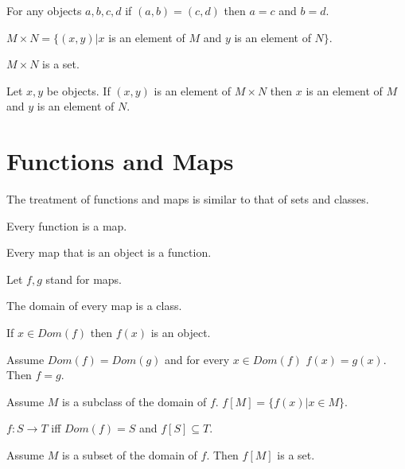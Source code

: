 \documentclass[11pt]{article}
\begin{document}
\begin{forthel}
\begin{axiom}
For any objects $a,b,c,d$ if $(a,b) = (c,d)$ then $a = c$
and $b = d$.
\end{axiom}

\begin{definition}
$M \times N = \{(x,y) | x$ is an element of $M$ and $y$
is an element of $N\}$.
\end{definition}

\begin{axiom}
$M \times N$ is a set.
\end{axiom}

\begin{lemma}
Let $x,y$ be objects.
If $(x,y)$ is an element of $M \times N$ then $x$ is an
element of $M$ and $y$ is an element of $N$.
\end{lemma}

\end{forthel}
\section{Functions and Maps}
The treatment of functions and maps is similar to that
of sets and classes.
\begin{forthel}

\begin{lemma} Every function is a map.
\end{lemma}

\begin{lemma} Every map that is an object is a function.
\end{lemma}

Let $f,g$ stand for maps.

\begin{lemma} The domain of every map is a class.
\end{lemma}

\begin{lemma} If $x \in Dom(f)$ then $f(x)$ is an object.
\end{lemma}

\begin{lemma}  Assume $Dom(f)=Dom(g)$ and for every $x \in Dom(f)$
$f(x)=g(x)$. Then $f=g$.
\end{lemma}

\begin{definition}
Assume $M$ is a subclass of the domain of $f$.
$f[M] = \{ f(x) | x \in M \}$.
\end{definition}

\begin{definition}
$f : S \rightarrow T$ iff $Dom (f) = S$ and $f[S] \subseteq T$.
\end{definition}

\begin{axiom} 
Assume $M$ is a subset of the domain of $f$.
Then $f[M]$ is a set.
\end{axiom}

\end{forthel}
\end{document}
